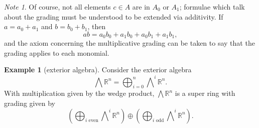 \documentclass[a4paper,10pt]{scrreprt}
\newcommand{\R}{\mathbb{R}}
\theoremstyle{definition}
\newtheorem{example}{Example}[section]
\theoremstyle{plain}
\theoremstyle{remark}
\newtheorem{note}{Note}[section]
\begin{document}
\begin{note}
  Of course, not all elements $c \in A$ are in $A_{0}$ or $A_{1}$; formulae which talk about the grading must be understood to be extended via additivity. If $a = a_{0} + a_{1}$ and $b = b_{0} + b_{1}$, then
  \begin{equation*}
    ab = a_{0} b_{0} + a_{1} b_{0} + a_{0} b_{1} + a_{1} b_{1},
  \end{equation*}
  and the axiom concerning the multiplicative grading can be taken to say that the grading applies to each monomial.
\end{note}

\begin{example}[exterior algebra]
  \label{eg:exterioralgebra}
  Consider the exterior algebra
  \begin{equation*}
    \bigwedge \R^{n} = \bigoplus_{i=0}^{n} \bigwedge\nolimits^{i} \R^{n}.
  \end{equation*}
  With multiplication given by the wedge product, $\bigwedge \R^{n}$ is a super ring with grading given by
  \begin{equation*}
    \left( \bigoplus_{i\text{ even}} \bigwedge\nolimits^{i}\R^{n} \right) \oplus \left( \bigoplus_{i\text{ odd}}\bigwedge\nolimits^{i}\R^{n} \right).
  \end{equation*}
\end{example}
\end{document}
